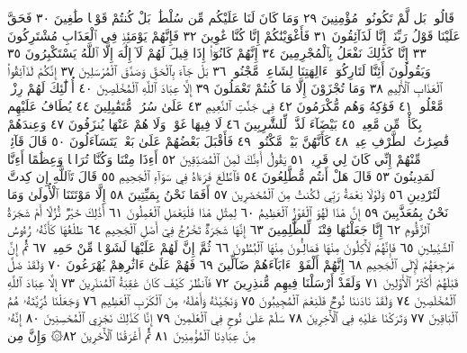 قَالُوا۟ بَل لَّمْ تَكُونُوا۟ مُؤْمِنِينَ ٢٩ وَمَا كَانَ لَنَا عَلَيْكُم مِّن سُلْطَٰنِۭۖ
بَلْ كُنتُمْ قَوْمࣰا طَٰغِينَ ٣٠ فَحَقَّ عَلَيْنَا قَوْلُ رَبِّنَآۖ إِنَّا لَذَآئِقُونَ ٣١
فَأَغْوَيْنَٰكُمْ إِنَّا كُنَّا غَٰوِينَ ٣٢ فَإِنَّهُمْ يَوْمَئِذࣲ فِي ٱلْعَذَابِ
مُشْتَرِكُونَ ٣٣ إِنَّا كَذَٰلِكَ نَفْعَلُ بِٱلْمُجْرِمِينَ ٣٤ إِنَّهُمْ كَانُوٓا۟ إِذَا قِيلَ
لَهُمْ لَآ إِلَٰهَ إِلَّا ٱللَّهُ يَسْتَكْبِرُونَ ٣٥ وَيَقُولُونَ أَئِنَّا لَتَارِكُوٓا۟ ءَالِهَتِنَا
لِشَاعِرࣲ مَّجْنُونِۭ ٣٦ بَلْ جَآءَ بِٱلْحَقِّ وَصَدَّقَ ٱلْمُرْسَلِينَ ٣٧ إِنَّكُمْ
لَذَآئِقُوا۟ ٱلْعَذَابِ ٱلْأَلِيمِ ٣٨ وَمَا تُجْزَوْنَ إِلَّا مَا كُنتُمْ تَعْمَلُونَ ٣٩
إِلَّا عِبَادَ ٱللَّهِ ٱلْمُخْلَصِينَ ٤٠ أُو۟لَٰٓئِكَ لَهُمْ رِزْقࣱ مَّعْلُومࣱ ٤١ فَوَٰكِهُ
وَهُم مُّكْرَمُونَ ٤٢ فِي جَنَّٰتِ ٱلنَّعِيمِ ٤٣ عَلَىٰ سُرُرࣲ مُّتَقَٰبِلِينَ ٤٤
يُطَافُ عَلَيْهِم بِكَأْسࣲ مِّن مَّعِينِۭ ٤٥ بَيْضَآءَ لَذَّةࣲ لِّلشَّٰرِبِينَ ٤٦
لَا فِيهَا غَوْلࣱ وَلَا هُمْ عَنْهَا يُنزَفُونَ ٤٧ وَعِندَهُمْ قَٰصِرَٰتُ
ٱلطَّرْفِ عِينࣱ ٤٨ كَأَنَّهُنَّ بَيْضࣱ مَّكْنُونࣱ ٤٩ فَأَقْبَلَ بَعْضُهُمْ عَلَىٰ
بَعْضࣲ يَتَسَآءَلُونَ ٥٠ قَالَ قَآئِلࣱ مِّنْهُمْ إِنِّي كَانَ لِي قَرِينࣱ ٥١
يَقُولُ أَءِنَّكَ لَمِنَ ٱلْمُصَدِّقِينَ ٥٢ أَءِذَا مِتْنَا وَكُنَّا تُرَابࣰا وَعِظَٰمًا أَءِنَّا
لَمَدِينُونَ ٥٣ قَالَ هَلْ أَنتُم مُّطَّلِعُونَ ٥٤ فَٱطَّلَعَ فَرَءَاهُ فِي سَوَآءِ
ٱلْجَحِيمِ ٥٥ قَالَ تَٱللَّهِ إِن كِدتَّ لَتُرْدِينِ ٥٦ وَلَوْلَا نِعْمَةُ رَبِّي
لَكُنتُ مِنَ ٱلْمُحْضَرِينَ ٥٧ أَفَمَا نَحْنُ بِمَيِّتِينَ ٥٨ إِلَّا مَوْتَتَنَا
ٱلْأُولَىٰ وَمَا نَحْنُ بِمُعَذَّبِينَ ٥٩ إِنَّ هَٰذَا لَهُوَ ٱلْفَوْزُ ٱلْعَظِيمُ ٦٠
لِمِثْلِ هَٰذَا فَلْيَعْمَلِ ٱلْعَٰمِلُونَ ٦١ أَذَٰلِكَ خَيْرࣱ نُّزُلًا أَمْ شَجَرَةُ
ٱلزَّقُّومِ ٦٢ إِنَّا جَعَلْنَٰهَا فِتْنَةࣰ لِّلظَّٰلِمِينَ ٦٣ إِنَّهَا شَجَرَةࣱ تَخْرُجُ
فِيٓ أَصْلِ ٱلْجَحِيمِ ٦٤ طَلْعُهَا كَأَنَّهُۥ رُءُوسُ ٱلشَّيَٰطِينِ ٦٥
فَإِنَّهُمْ لَأٓكِلُونَ مِنْهَا فَمَالِـُٔونَ مِنْهَا ٱلْبُطُونَ ٦٦ ثُمَّ إِنَّ لَهُمْ
عَلَيْهَا لَشَوْبࣰا مِّنْ حَمِيمࣲ ٦٧ ثُمَّ إِنَّ مَرْجِعَهُمْ لَإِلَى ٱلْجَحِيمِ ٦٨
إِنَّهُمْ أَلْفَوْا۟ ءَابَآءَهُمْ ضَآلِّينَ ٦٩ فَهُمْ عَلَىٰٓ ءَاثَٰرِهِمْ يُهْرَعُونَ ٧٠
وَلَقَدْ ضَلَّ قَبْلَهُمْ أَكْثَرُ ٱلْأَوَّلِينَ ٧١ وَلَقَدْ أَرْسَلْنَا فِيهِم
مُّنذِرِينَ ٧٢ فَٱنظُرْ كَيْفَ كَانَ عَٰقِبَةُ ٱلْمُنذَرِينَ ٧٣
إِلَّا عِبَادَ ٱللَّهِ ٱلْمُخْلَصِينَ ٧٤ وَلَقَدْ نَادَىٰنَا نُوحࣱ فَلَنِعْمَ
ٱلْمُجِيبُونَ ٧٥ وَنَجَّيْنَٰهُ وَأَهْلَهُۥ مِنَ ٱلْكَرْبِ ٱلْعَظِيمِ ٧٦
وَجَعَلْنَا ذُرِّيَّتَهُۥ هُمُ ٱلْبَاقِينَ ٧٧ وَتَرَكْنَا عَلَيْهِ فِي ٱلْأٓخِرِينَ ٧٨ سَلَٰمٌ
عَلَىٰ نُوحࣲ فِي ٱلْعَٰلَمِينَ ٧٩ إِنَّا كَذَٰلِكَ نَجْزِي ٱلْمُحْسِنِينَ ٨٠ إِنَّهُۥ
مِنْ عِبَادِنَا ٱلْمُؤْمِنِينَ ٨١ ثُمَّ أَغْرَقْنَا ٱلْأٓخَرِينَ ٨٢۞ وَإِنَّ مِن
